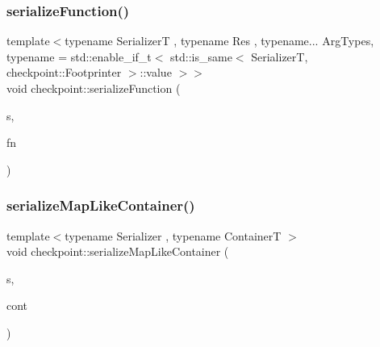 \mbox{\label{namespacecheckpoint_a4161978e6d6de385d942cbcbe659817a}} 
\subsubsection{\texorpdfstring{serialize\+Function()}{serializeFunction()}}
{\footnotesize\ttfamily template$<$typename SerializerT , typename Res , typename... Arg\+Types, typename  = std\+::enable\+\_\+if\+\_\+t$<$    std\+::is\+\_\+same$<$      Serializer\+T,      checkpoint\+::\+Footprinter    $>$\+::value  $>$$>$ \\
void checkpoint\+::serialize\+Function (\begin{DoxyParamCaption}\item[{SerializerT \&}]{s,  }\item[{std\+::function$<$ Res(Arg\+Types...)$>$ \&}]{fn }\end{DoxyParamCaption})}

\mbox{\label{namespacecheckpoint_a99092baac18b33d03b1bb47ed1f2d7fa}} 
\subsubsection{\texorpdfstring{serialize\+Map\+Like\+Container()}{serializeMapLikeContainer()}}
{\footnotesize\ttfamily template$<$typename Serializer , typename ContainerT $>$ \\
void checkpoint\+::serialize\+Map\+Like\+Container (\begin{DoxyParamCaption}\item[{Serializer \&}]{s,  }\item[{ContainerT \&}]{cont }\end{DoxyParamCaption})\hspace{0.3cm}{\ttfamily [inline]}}

\mbox{\label{namespacecheckpoint_a0b15edc50a881e06260e7112b2c60742}} 
